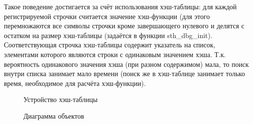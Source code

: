 \documentclass{article}
\begin{document}
Такое поведение достигается за счёт использования хэш-таблицы: для каждой регистрируемой строчки считается значение хэш-функции (для этого перемножаются все символы строчки кроме завершающего нулевого и делятся с остатком на размер хэш-таблицы (задаётся в функции sth\_dbg\_init). Соответствующая строчка хэш-таблицы содержит указатель на список, элементами которого являются строки с одинаковым значением хэша. Т.к. вероятность одинакового значения хэша (при разном содержимом) мала, то поиск внутри списка занимает мало времени (поиск же в хэш-таблице занимает только время, необходимое для расчёта хэш-функции).

\begin{figure}[h!]
	\caption{Устройство хэш-таблицы}
	\label{ris:hash-table}
	\end{figure}

\newpage
\begin{figure}[h!]
	\caption{Диаграмма объектов}
	\label{ris:object-dia}
	\end{figure}
\end{document}
